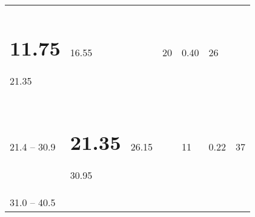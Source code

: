 \documentclass[]{book}
\begin{document}
\begin{longtable}[]{@{}lllllll@{}}
\begin{minipage}[t]{0.11\columnwidth}
{\section{11.75}\label{section}}

21.35\strut
\end{minipage} & \begin{minipage}[t]{0.11\columnwidth}\raggedright
16.55\strut
\end{minipage} & \begin{minipage}[t]{0.11\columnwidth}\raggedright
\strut
\end{minipage} & \begin{minipage}[t]{0.11\columnwidth}\raggedright
20\strut
\end{minipage} & \begin{minipage}[t]{0.11\columnwidth}\raggedright
0.40\strut
\end{minipage} & \begin{minipage}[t]{0.11\columnwidth}\raggedright
26\strut
\end{minipage}\tabularnewline
\begin{minipage}[t]{0.11\columnwidth}\raggedright
21.4 --
30.9\strut
\end{minipage} & \begin{minipage}[t]{0.11\columnwidth}\raggedright
\hypertarget{section-1}{%
\section{21.35}\label{section-1}}

30.95\strut
\end{minipage} & \begin{minipage}[t]{0.11\columnwidth}\raggedright
26.15\strut
\end{minipage} & \begin{minipage}[t]{0.11\columnwidth}\raggedright
~\strut
\end{minipage} & \begin{minipage}[t]{0.11\columnwidth}\raggedright
11\strut
\end{minipage} & \begin{minipage}[t]{0.11\columnwidth}\raggedright
0.22\strut
\end{minipage} & \begin{minipage}[t]{0.11\columnwidth}\raggedright
37\strut
\end{minipage}\tabularnewline
\begin{minipage}[t]{0.11\columnwidth}\raggedright
31.0 --
40.5\strut
\end{minipage} & \begin{minipage}[t]{0.11\columnwidth}\raggedright
\hypertarget{section-2}{%
}
\end{minipage}
\end{longtable}
\end{document}
